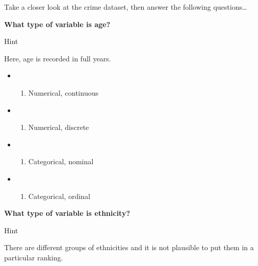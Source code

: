 \documentclass[
]{book}
\providecommand{\tightlist}{%
  \setlength{\itemsep}{0pt}\setlength{\parskip}{0pt}}
\begin{document}
Take a closer look at the crime dataset, then answer the following questions\ldots{}

\textbf{What type of variable is age?}

Hint

Here, age is recorded in full years.

\begin{itemize}
\item
  \begin{enumerate}
  \def\labelenumi{(\Alph{enumi})}
  \tightlist
  \item
    Numerical, continuous\\
  \end{enumerate}
\item
  \begin{enumerate}
  \def\labelenumi{(\Alph{enumi})}
  \setcounter{enumi}{1}
  \tightlist
  \item
    Numerical, discrete\\
  \end{enumerate}
\item
  \begin{enumerate}
  \def\labelenumi{(\Alph{enumi})}
  \setcounter{enumi}{2}
  \tightlist
  \item
    Categorical, nominal\\
  \end{enumerate}
\item
  \begin{enumerate}
  \def\labelenumi{(\Alph{enumi})}
  \setcounter{enumi}{3}
  \tightlist
  \item
    Categorical, ordinal
  \end{enumerate}
\end{itemize}

\textbf{What type of variable is ethnicity?}

Hint

There are different groups of ethnicities and it is not plausible to put them in a particular ranking.
\end{document}
